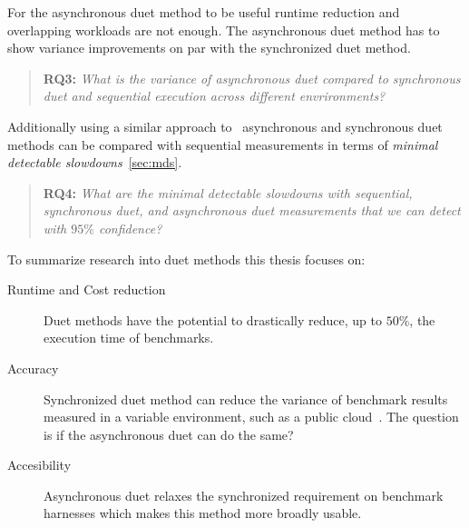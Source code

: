 For the asynchronous duet method to be useful runtime reduction and overlapping workloads are not enough.
The asynchronous duet method has to show variance improvements on par with the synchronized duet method.

\begin{quote}
	\textbf{RQ3:} \emph{What is the variance of asynchronous duet compared to synchronous duet and sequential execution across different envrironments?}
\end{quote}

Additionally using a similar approach to~\citet{laaber2019software} asynchronous and synchronous duet methods can be compared with sequential measurements in terms of \emph{minimal detectable slowdowns}~\cref{sec:mds}.

\begin{quote}
	\textbf{RQ4:} \emph{What are the minimal detectable slowdowns with sequential, synchronous duet, and asynchronous duet measurements that we can detect with $95\%$ confidence?}
\end{quote}

To summarize research into duet methods this thesis focuses on:
\begin{description}
	\item[Runtime and Cost reduction] Duet methods have the potential to drastically reduce, up to $50\%$, the execution time of benchmarks.
	\item[Accuracy] Synchronized duet method can reduce the variance of benchmark results measured in a variable environment, such as a public cloud~\citet{bulej2020duet}. The question is if the asynchronous duet can do the same?
	\item[Accesibility] Asynchronous duet relaxes the synchronized requirement on benchmark harnesses which makes this method more broadly usable.
\end{description}
